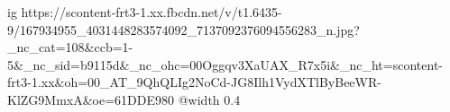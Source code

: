  
 
 
 
 

\ifcmt
  ig https://scontent-frt3-1.xx.fbcdn.net/v/t1.6435-9/167934955_4031448283574092_7137092376094556283_n.jpg?_nc_cat=108&ccb=1-5&_nc_sid=b9115d&_nc_ohc=00Oggqv3XaUAX_R7x5i&_nc_ht=scontent-frt3-1.xx&oh=00_AT_9QhQLIg2NoCd-JG8Ilh1VydXTlByBeeWR-KlZG9MmxA&oe=61DDE980
  @width 0.4
\fi

